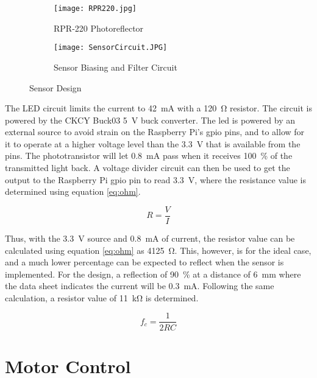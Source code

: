 \begin{figure}[H]
	\centering
	\begin{subfigure}[t]{.315\textwidth}
		\centering
		\texttt{[image: RPR220.jpg]}
		\caption{RPR-220 Photoreflector}
		\citep{RPR:2015}
		\label{fig:rpr}
	\end{subfigure}
	\begin{subfigure}[t]{.65\textwidth}
		\centering
		\texttt{[image: SensorCircuit.JPG]}
		\caption{Sensor Biasing and Filter Circuit}
		\label{fig:sensorD}
	\end{subfigure}
	\caption{Sensor Design}
	\label{fig:Sensor}
\end{figure}

The LED circuit limits the current to \SI{42}{\milli\ampere} with a \SI{120}{\ohm} resistor. The circuit is powered by the CKCY Buck03 \SI{5}{\volt} buck converter. The \acs{led} is powered by an external source to avoid strain on the Raspberry Pi's \acs{gpio} pins, and to allow for it to operate at a higher voltage level than the \SI{3.3}{\volt} that is available from the pins. The phototransistor will let \SI{0.8}{\milli\ampere} pass when it receives \SI{100}{\percent} of the transmitted light back. A voltage divider circuit can then be used to get the output to the Raspberry Pi \ac{gpio} pin to read \SI{3.3}{\volt}, where the resistance value is determined using equation \ref{eq:ohm}. 

\begin{equation}
	R = \frac{V}{I}
	\label{eq:ohm}
\end{equation}

Thus, with the \SI{3.3}{\volt} source and \SI{0.8}{\milli\ampere} of current, the resistor value can be calculated using equation \ref{eq:ohm} as \SI{4125}{\ohm}. This, however, is for the ideal case, and a much lower percentage can be expected to reflect when the sensor is implemented. For the design, a reflection of \SI{90}{\percent} at a distance of \SI{6}{\milli\meter} where the data sheet indicates the current will be \SI{0.3}{\milli\ampere}. Following the same calculation, a resistor value of \SI{11}{\kilo\ohm} is determined.

\begin{equation}
	f_c = \frac{1}{2 R C}
\end{equation}

\newpage

\section{Motor Control}

